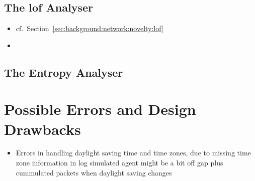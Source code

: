 \subsection{The \Glsdesc{lof} Analyser}
\label{sec:concept:anal:lof}

\begin{itemize}
	\item cf.~Section~\ref{sec:background:network:novelty:lof}
	\item 
\end{itemize}

\subsection{The Entropy Analyser}
\label{sec:concept:anal:entropy}

\section{Possible Errors and Design Drawbacks}
\label{sec:concept:flaws}
\begin{itemize}
	\item Errors in handling daylight saving time and time zones, due to missing time zone information in log
		\subitem simulated agent might be a bit off
		\subitem gap plus cummulated packets when daylight saving changes
\end{itemize}
